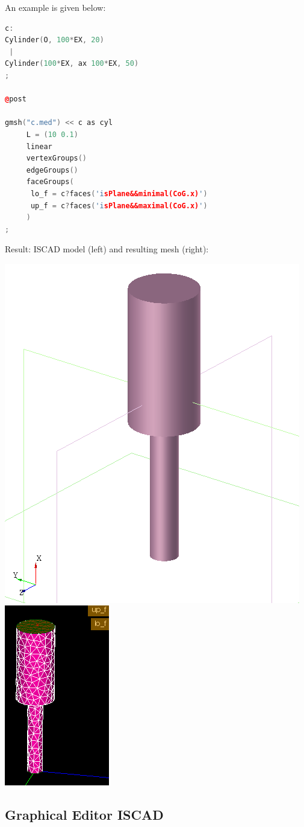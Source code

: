 An example is given below:

\begin{lstlisting}[language=c++]
c:
Cylinder(O, 100*EX, 20)
 |
Cylinder(100*EX, ax 100*EX, 50)
;

@post

gmsh("c.med") << c as cyl
     L = (10 0.1)
     linear
     vertexGroups()
     edgeGroups()
     faceGroups(
      lo_f = c?faces('isPlane&&minimal(CoG.x)')
      up_f = c?faces('isPlane&&maximal(CoG.x)')
     )
;
\end{lstlisting}


Result: ISCAD model (left) and resulting mesh (right):

\includegraphics[width=0.45\linewidth]{figs/iscad/gmsh_example_iscad.png}
\includegraphics[width=0.45\linewidth]{figs/iscad/gmsh_example_mesh.png}

\subsection{Graphical Editor ISCAD}

